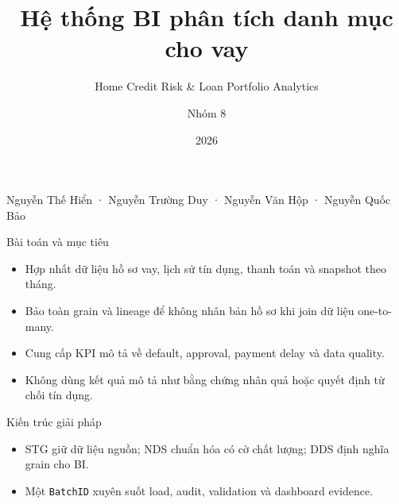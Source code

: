 \documentclass[aspectratio=169,11pt]{beamer}
\title{Hệ thống BI phân tích danh mục cho vay}
\subtitle{Home Credit Risk \& Loan Portfolio Analytics}
\author{Nhóm 8}
\institute{Hệ thống thông tin phục vụ trí tuệ kinh doanh}
\date{2026}
\begin{document}
\begin{frame}
  \titlepage
  \vfill
  \centering
  \scriptsize Nguyễn Thế Hiển · Nguyễn Trường Duy · Nguyễn Văn Hộp · Nguyễn Quốc Bảo
\end{frame}

\begin{frame}{Bài toán và mục tiêu}
\begin{itemize}
  \item Hợp nhất dữ liệu hồ sơ vay, lịch sử tín dụng, thanh toán và snapshot theo tháng.
  \item Bảo toàn grain và lineage để không nhân bản hồ sơ khi join dữ liệu one-to-many.
  \item Cung cấp KPI mô tả về default, approval, payment delay và data quality.
  \item Không dùng kết quả mô tả như bằng chứng nhân quả hoặc quyết định từ chối tín dụng.
\end{itemize}
\end{frame}

\begin{frame}{Kiến trúc giải pháp}
\centering
{}
\vfill
\begin{itemize}
  \item STG giữ dữ liệu nguồn; NDS chuẩn hóa có cờ chất lượng; DDS định nghĩa grain cho BI.
  \item Một \texttt{BatchID} xuyên suốt load, audit, validation và dashboard evidence.
\end{itemize}
\end{frame}
\end{document}
